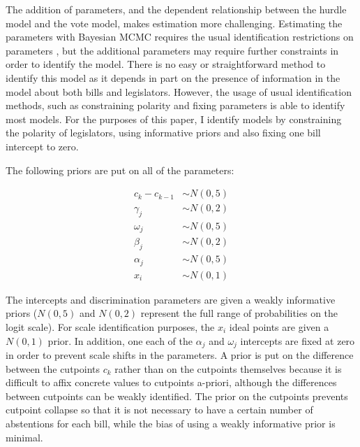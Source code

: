 	The addition of parameters, and the dependent relationship between the hurdle model and the vote model, makes estimation more challenging. Estimating the parameters with Bayesian MCMC requires the usual identification restrictions on parameters \parencite{jackman2004,gelman2005}, but the additional parameters may require further constraints in order to identify the model. There is no easy or straightforward method to identify this model as it depends in part on the presence of information in the model about both bills and legislators. However, the usage of usual identification methods, such as constraining polarity and fixing parameters is able to identify most models. For the purposes of this paper, I identify models by constraining the polarity of legislators, using informative priors and also fixing one bill intercept to zero.
	
	The following priors are put on all of the parameters:
	
	\begin{align*}
		c_k - c_{k-1} &\sim N(0,5)\\
		\gamma_j &\sim N(0,2)\\
		\omega_j &\sim N(0,5)\\
		\beta_j &\sim N(0,2)\\
		\alpha_j &\sim N(0,5)\\
		x_i &\sim N(0,1)
	\end{align*}

	
	The intercepts and discrimination parameters are given a weakly informative priors ($N(0,5)$ and $N(0,2)$ represent the full range of probabilities on the logit scale). For scale identification purposes, the $x_i$ ideal points are given a $N(0,1)$ prior. In addition, one each of the $\alpha_j$ and $\omega_j$ intercepts are fixed at zero in order to prevent scale shifts in the parameters. A prior is put on the difference between the cutpoints $c_k$ rather than on the cutpoints themselves because it is difficult to affix concrete values to cutpoints a-priori, although the differences between cutpoints can be weakly identified. The prior on the cutpoints prevents cutpoint collapse so that it is not necessary to have a certain number of abstentions for each bill, while the bias of using a weakly informative prior is minimal.
	
